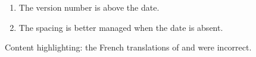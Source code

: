 \documentclass{tutodoc}
\begin{document}
\small

\begin{tdocupdate}
    \item {}
    \begin{enumerate}
        \item The version number is above the date.

        \item The spacing is better managed when the date is absent.
    \end{enumerate}
\end{tdocupdate}


\begin{tdocfix}
    \item Content highlighting: the French translations of  and  were incorrect.
\end{tdocfix}
\end{document}
